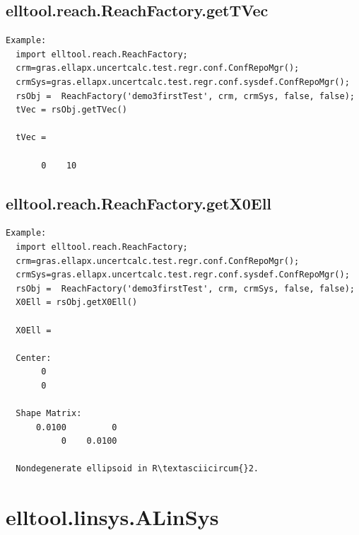 \documentclass[letterpaper,10pt,english]{sphinxmanual}
\begin{document}
\subsection{elltool.reach.ReachFactory.getTVec}
\label{chap_functions:elltool-reach-reachfactory-gettvec}
\begin{Verbatim}[commandchars=\\\{\}]
Example:
  import elltool.reach.ReachFactory;
  crm=gras.ellapx.uncertcalc.test.regr.conf.ConfRepoMgr();
  crmSys=gras.ellapx.uncertcalc.test.regr.conf.sysdef.ConfRepoMgr();
  rsObj =  ReachFactory('demo3firstTest', crm, crmSys, false, false);
  tVec = rsObj.getTVec()

  tVec =

       0    10
\end{Verbatim}


\subsection{elltool.reach.ReachFactory.getX0Ell}
\label{chap_functions:elltool-reach-reachfactory-getx0ell}
\begin{Verbatim}[commandchars=\\\{\}]
Example:
  import elltool.reach.ReachFactory;
  crm=gras.ellapx.uncertcalc.test.regr.conf.ConfRepoMgr();
  crmSys=gras.ellapx.uncertcalc.test.regr.conf.sysdef.ConfRepoMgr();
  rsObj =  ReachFactory('demo3firstTest', crm, crmSys, false, false);
  X0Ell = rsObj.getX0Ell()

  X0Ell =

  Center:
       0
       0

  Shape Matrix:
      0.0100         0
           0    0.0100

  Nondegenerate ellipsoid in R\textasciicircum{}2.
\end{Verbatim}


\section{elltool.linsys.ALinSys}
\label{chap_functions:elltool-linsys-alinsys}
\end{document}
